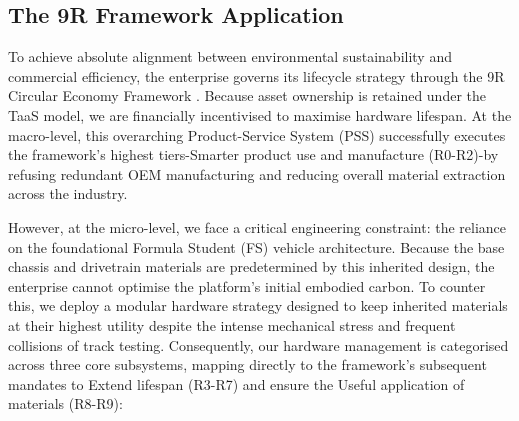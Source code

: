 \subsection{The 9R Framework Application}

To achieve absolute alignment between environmental sustainability and commercial efficiency, the enterprise governs its lifecycle strategy through the 9R Circular Economy Framework \cite[p.~5]{potting_2017}. Because asset ownership is retained under the TaaS model, we are financially incentivised to maximise hardware lifespan. At the macro-level, this overarching Product-Service System (PSS) successfully executes the framework's highest tiers-Smarter product use and manufacture (R0-R2)-by refusing redundant OEM manufacturing and reducing overall material extraction across the industry.

However, at the micro-level, we face a critical engineering constraint: the reliance on the foundational Formula Student (FS) vehicle architecture. Because the base chassis and drivetrain materials are predetermined by this inherited design, the enterprise cannot optimise the platform's initial embodied carbon. To counter this, we deploy a modular hardware strategy designed to keep inherited materials at their highest utility despite the intense mechanical stress and frequent collisions of track testing. Consequently, our hardware management is categorised across three core subsystems, mapping directly to the framework's subsequent mandates to Extend lifespan (R3-R7) and ensure the Useful application of materials (R8-R9):

